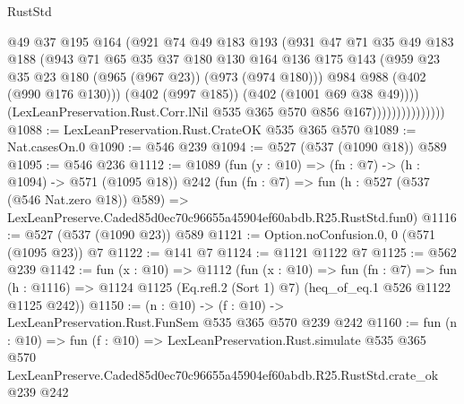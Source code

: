 \begin{lexlean}{RustStd}
\begin{coremodule}
                                @49
                                @37
                                @195
                                @164
                                (@921
                                  @74
                                  @49
                                  @183
                                  @193
                                  (@931
                                    @47
                                    @71
                                    @35
                                    @49
                                    @183
                                    @188
                                    (@943
                                      @71
                                      @65
                                      @35
                                      @37
                                      @180
                                      @130
                                      @164
                                      @136
                                      @175
                                      @143
                                      (@959 @23 @35 @23 @180 (@965 (@967 @23)) (@973 (@974 @180)))
                                      @984
                                      @988
                                      (@402 (@990 @176 @130)))
                                    (@402 (@997 @185))
                                    (@402 (@1001 @69 @38 @49))))
                                (LexLeanPreservation.Rust.Corr.lNil
                                  @535
                                  @365
                                  @570
                                  @856
                                  @167)))))))))))))))
@1088 := LexLeanPreservation.Rust.CrateOK @535 @365 @570
@1089 := Nat.casesOn.{0}
@1090 := @546 @239
@1094 := @527 (@537 (@1090 @18)) @589
@1095 := @546 @236
@1112 := @1089
    (fun (y : @10) => (fn : @7) -> (h : @1094) -> @571 (@1095 @18))
    @242
    (fun (fn : @7) =>
    fun (h : @527 (@537 (@546 Nat.zero @18)) @589) =>
    LexLeanPreserve.Caded85d0ec70c96655a45904ef60abdb.R25.RustStd.fun0)
@1116 := @527 (@537 (@1090 @23)) @589
@1121 := Option.noConfusion.{0, 0} (@571 (@1095 @23)) @7
@1122 := @141 @7
@1124 := @1121 @1122 @7
@1125 := @562 @239
@1142 := fun (x : @10) =>
  @1112
    (fun (x : @10) =>
    fun (fn : @7) =>
    fun (h : @1116) => @1124 @1125 (Eq.refl.{2} (Sort 1) @7) (heq_of_eq.{1} @526 @1122 @1125 @242))
@1150 := (n : @10) -> (f : @10) -> LexLeanPreservation.Rust.FunSem @535 @365 @570 @239 @242
@1160 := fun (n : @10) =>
  fun (f : @10) =>
  LexLeanPreservation.Rust.simulate
    @535
    @365
    @570
    LexLeanPreserve.Caded85d0ec70c96655a45904ef60abdb.R25.RustStd.crate_ok
    @239
    @242
\end{coremodule}
\end{lexlean}
